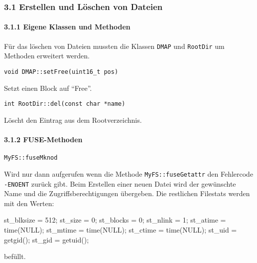 \documentclass[]{article}
\newenvironment{Shaded}{}{}
\newcommand{\DecValTok}[1]{\textcolor[rgb]{0.25,0.63,0.44}{#1}}
\newcommand{\NormalTok}[1]{#1}
\let\oldparagraph\paragraph
\renewcommand{\paragraph}[1]{\oldparagraph{#1}\mbox{}}
\begin{document}
\hypertarget{erstellen-und-luxf6schen-von-dateien}{%
\subsubsection{3.1 Erstellen und Löschen von
Dateien}\label{erstellen-und-luxf6schen-von-dateien}}

\hypertarget{eigene-klassen-und-methoden-1}{%
\paragraph{3.1.1 Eigene Klassen und
Methoden}\label{eigene-klassen-und-methoden-1}}

Für das löschen von Dateien mussten die Klassen \texttt{DMAP} und
\texttt{RootDir} um Methoden erweitert werden.

\texttt{void\ DMAP::setFree(uint16\_t\ pos)}

Setzt einen Block auf ``Free''.

\texttt{int\ RootDir::del(const\ char\ *name)}

Löscht den Eintrag aus dem Rootverzeichnis.


\hypertarget{fuse-methoden-1}{%
\paragraph{3.1.2 FUSE-Methoden}\label{fuse-methoden-1}}

\texttt{MyFS::fuseMknod}

Wird nur dann aufgerufen wenn die Methode \texttt{MyFS::fuseGetattr} den
Fehlercode \texttt{-ENOENT} zurück gibt. Beim Erstellen einer neuen
Datei wird der gewünschte Name und die Zugriffsberechtigungen übergeben.
Die restlichen Filestats werden mit den Werten:

\begin{Shaded}
  \begin{framed}
\begin{Highlighting}[]
\NormalTok{st_blksize = }\DecValTok{512}\NormalTok{;}
\NormalTok{st_size = }\DecValTok{0}\NormalTok{;}
\NormalTok{st_blocks = }\DecValTok{0}\NormalTok{;}
\NormalTok{st_nlink = }\DecValTok{1}\NormalTok{;}
\NormalTok{st_atime = time(NULL);}
\NormalTok{st_mtime = time(NULL);}
\NormalTok{st_ctime = time(NULL);}
\NormalTok{st_uid = getgid();}
\NormalTok{st_gid = getuid();}
\end{Highlighting}
\end{framed}
\end{Shaded}

befüllt.
\end{document}
